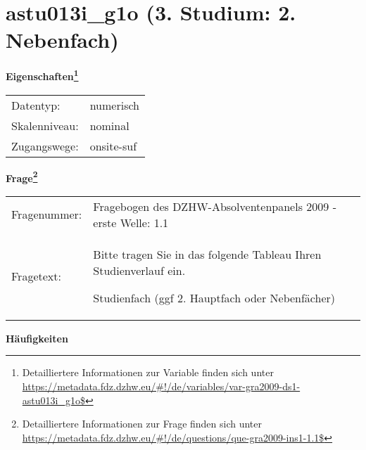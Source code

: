 
    \setcounter{footnote}{0}

    \vspace*{-1.8cm}
	\section{astu013i\_g1o (3. Studium: 2. Nebenfach)}
	\label{section:astu013i_g1o}



    \vspace*{0.5cm}
    \noindent\textbf{Eigenschaften\footnote{Detailliertere Informationen zur Variable finden sich unter
		\url{https://metadata.fdz.dzhw.eu/\#!/de/variables/var-gra2009-ds1-astu013i_g1o$}}}\\
	\begin{tabularx}{\hsize}{@{}lX}
	Datentyp: & numerisch \\
	Skalenniveau: & nominal \\
	Zugangswege: &
	  onsite-suf
 \\
    \end{tabularx}



				\vspace*{0.5cm}
                \noindent\textbf{Frage\footnote{Detailliertere Informationen zur Frage finden sich unter
		              \url{https://metadata.fdz.dzhw.eu/\#!/de/questions/que-gra2009-ins1-1.1$}}}\\
				\begin{tabularx}{\hsize}{@{}lX}
					Fragenummer: &
					  Fragebogen des DZHW-Absolventenpanels 2009 - erste Welle:
					  1.1
 \\
					Fragetext: & Bitte tragen Sie in das folgende Tableau Ihren Studienverlauf ein.\par  Studienfach (ggf 2. Hauptfach oder Nebenfächer) \\
				\end{tabularx}





        		\vspace*{0.5cm}
                \noindent\textbf{Häufigkeiten}


